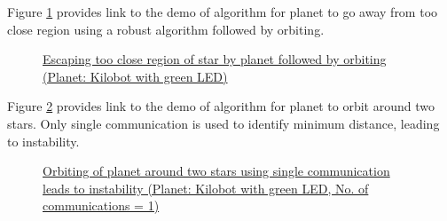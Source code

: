 \documentclass{report}[12pt]
\begin{document}
Figure \ref{fig:orbit_after_escape} provides link to the demo of algorithm for planet to go away from too close region using a robust algorithm followed by orbiting.
\begin{figure}[H]
    \centering
    \caption{\href{https://youtu.be/X6dGCLT0ho8}{Escaping too close region of star by planet followed by orbiting (Planet: Kilobot with green LED)}}
    \label{fig:orbit_after_escape}
\end{figure}

Figure \ref{fig:orbit_two_star_comm1} provides link to the demo of algorithm for planet to orbit around two stars. Only single communication is used to identify minimum distance, leading to instability.
\begin{figure}[H]
    \centering
    \caption{\href{https://youtu.be/mhW04WvGKuQ}{Orbiting of planet around two stars using single communication leads to instability (Planet: Kilobot with green LED, No. of communications = 1)}}
    \label{fig:orbit_two_star_comm1}
\end{figure}
\end{document}
